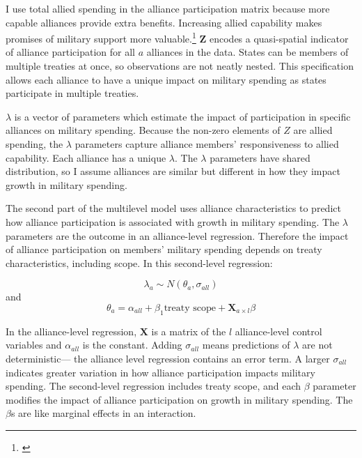 \documentclass[12pt]{article}
\begin{document}
I use total allied spending in the alliance participation matrix because more capable alliances provide extra benefits.
Increasing allied capability makes promises of military support more valuable.\footnote{\citep{Johnsonetal2015}} 
$\textbf{Z}$ encodes a quasi-spatial indicator of alliance participation for all $a$ alliances in the data. 
States can be members of multiple treaties at once, so observations are not neatly nested. 
This specification allows each alliance to have a unique impact on military spending as states participate in multiple treaties. 


$\lambda$ is a vector of parameters which estimate the impact of participation in specific alliances on military spending. 
Because the non-zero elements of $Z$ are allied spending, the $\lambda$ parameters capture alliance members' responsiveness to allied capability. 
Each alliance has a unique $\lambda$. 
The $\lambda$ parameters have shared distribution, so I assume alliances are similar but different in how they impact growth in military spending. 


The second part of the multilevel model uses alliance characteristics to predict how alliance participation is associated with growth in military spending. 
The $\lambda$ parameters are the outcome in an alliance-level regression.
Therefore the impact of alliance participation on members' military spending depends on treaty characteristics, including scope. 
In this second-level regression: 


\begin{equation}
\lambda_{a} \sim N(\theta_{a}, \sigma_{all})
\end{equation} 
and 
\begin{equation}
\theta_{a} = \alpha_{all} + \beta_1 \mbox{treaty scope} + \textbf{X}_{a \times l} \beta
\end{equation}


In the alliance-level regression, $\textbf{X}$ is a matrix of the $l$ alliance-level control variables and $\alpha_{all}$ is the constant.
Adding $\sigma_{all}$ means predictions of $\lambda$ are not deterministic--- the alliance level regression contains an error term. 
A larger $\sigma_{all}$ indicates greater variation in how alliance participation impacts military spending. 
The second-level regression includes treaty scope, and each $\beta$ parameter modifies the impact of alliance participation on growth in military spending. 
The $\beta$s are like marginal effects in an interaction. 
\end{document}
